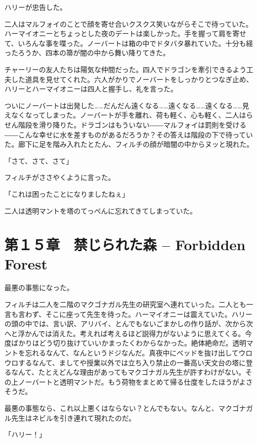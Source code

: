 \documentclass[10pt,a4paper]{article}
\begin{document}
\begin{CJK}{UTF8}{min}
ハリーが忠告した。

二人はマルフォイのことで顔を寄せ合いクスクス笑いながらそこで待っていた。ハーマイオニーとちょっとした夜のデートは楽しかった。手を握って肩を寄せて、いろんな事を喋った。ノーバートは箱の中でドタバタ暴れていた。十分も経ったろうか、四本の箒が闇の中から舞い降りてきた。

チャーリーの友人たちは陽気な仲間だった。四人でドラゴンを牽引できるよう工夫した道具を見せてくれた。六人がかりでノーバートをしっかりとつなぎ止め、ハリーとハーマイオニーは四人と握手し、礼を言った。

ついにノーバートは出発した……だんだん遠くなる……遠くなる……遠くなる……見えなくなってしまった。ノーバートが手を離れ、荷も軽く、心も軽く、二人はらせん階段を滑り降りた。ドラゴンはもういない――マルフォイは罰則を受ける――こんな幸せに水を差すものがあるだろうか？その答えは階段の下で待っていた。廊下に足を階み入れたとたん、フィルチの顔が暗闇の中からヌッと現れた。

「さて、さて、さて」

フィルチがささやくように言った。

「これは困ったことになりましたねぇ」

二人は透明マントを塔のてっぺんに忘れてきてしまっていた。




\section{第１５章　禁じられた森 -- Forbidden Forest}





最悪の事態になった。

フィルチは二人を二階のマクゴナガル先生の研究室へ連れていった。二人とも一言も言わず、そこに座って先生を待った。ハーマイオニーは震えていた。ハリーの頭の中では、言い訳、アリバイ、とんでもないごまかしの作り話が、次から次へと浮かんでは消えた。考えれば考えるほど説得力がないように思えてくる。今度ばかりはどう切り抜けていいかまったくわからなかった。絶体絶命だ。透明マントを忘れるなんて、なんというドジなんだ。真夜中にべッドを抜け出してウロウロするなんて、ましてや授業以外では立ち入り禁止の一番高い天文台の塔に登るなんて、たとえどんな理由があってもマクゴナガル先生が許すわけがない。その上ノーバートと透明マントだ。もう荷物をまとめて帰る仕度をしたほうがよさそうだ。

最悪の事態なら、これ以上悪くはならない？とんでもない。なんと、マクゴナガル先生はネビルを引き連れて現れたのだ。

「ハリー！」


\end{CJK}
\end{document}
